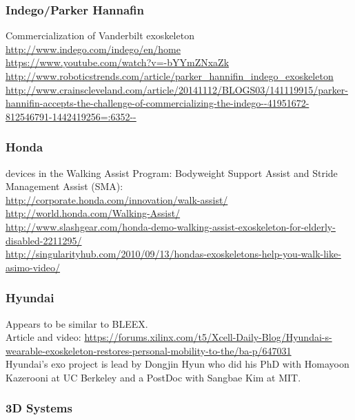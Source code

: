 \subsubsection{Indego/Parker Hannafin}

\noindent
Commercialization of Vanderbilt exoskeleton\\
\url{http://www.indego.com/indego/en/home}\\
\url{https://www.youtube.com/watch?v=-bYYmZNxaZk}\\
\url{http://www.roboticstrends.com/article/parker_hannifin_indego_exoskeleton}\\
\url{http://www.crainscleveland.com/article/20141112/BLOGS03/141119915/parker-hannifin-accepts-the-challenge-of-commercializing-the-indego--41951672-812546791-1442419256=:6352--}\\

\subsubsection{Honda}

 devices in the Walking Assist Program: Bodyweight Support Assist and
Stride Management Assist (SMA):\\
\url{http://corporate.honda.com/innovation/walk-assist/}\\
\url{http://world.honda.com/Walking-Assist/}\\
\url{http://www.slashgear.com/honda-demo-walking-assist-exoskeleton-for-elderly-disabled-2211295/}\\
\url{http://singularityhub.com/2010/09/13/hondas-exoskeletons-help-you-walk-like-asimo-video/}\\

\subsubsection{Hyundai}

\noindent
Appears to be similar to BLEEX.\\
Article and video: \url{https://forums.xilinx.com/t5/Xcell-Daily-Blog/Hyundai-s-wearable-exoskeleton-restores-personal-mobility-to-the/ba-p/647031}\\
Hyundai's exo project is lead by Dongjin Hyun who did his
PhD with Homayoon Kazerooni at UC Berkeley and a PostDoc with Sangbae
Kim at MIT.

\subsubsection{3D Systems}

